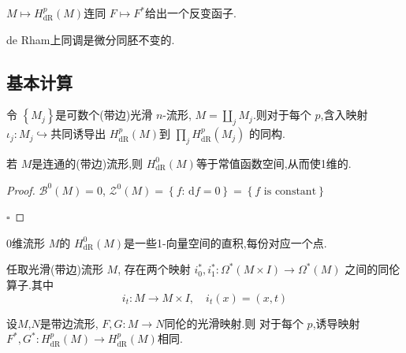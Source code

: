\documentclass[../../几何与拓扑.tex]{subfiles}
\begin{document}
\begin{corollary}
    \(  M\mapsto H_{\mathrm{dR}}^{p}\left( M \right)   \)连同 \(  F\mapsto F^{*}  \)给出一个反变函子.  
\end{corollary}

\begin{corollary}
    de Rham上同调是微分同胚不变的.
\end{corollary}
\subsection{基本计算}

\begin{proposition}
    令 \(  \left\{ M_{j} \right\}  \)是可数个(带边)光滑 \(  n  \)-流形, \(  M= \coprod  _{j}M_{j}  \).则对于每个 \(  p  \),含入映射 \(  \iota _{j}:M_{j}\hookrightarrow   \)共同诱导出 \(  H_{\mathrm{dR}}^{p}\left( M \right)   \)到 \(  \prod _{j}H_{\mathrm{dR}}^{p}\left( M_{j} \right)   \)      的同构.
\end{proposition}


\begin{proposition}
    若 \(  M  \)是连通的(带边)流形,则 \(  H_{\mathrm{dR}}^{0}\left( M \right)   \)等于常值函数空间,从而使1维的.  
\end{proposition}

\begin{proof}
    \(  \mathcal{B}^{0}\left( M \right)= 0   \), \(  \mathcal{Z}^{0}\left( M \right)= \left\{ f: \,\mathrm{d} f= 0 \right\}= \left\{ f \text{ is constant} \right\}   \)  

    \hfill $\square$
\end{proof}

\begin{corollary}
    0维流形 \(  M  \)的 \(  H_{\mathrm{dR}}^{0}\left( M \right)   \)是一些1-向量空间的直积,每份对应一个点.  
\end{corollary}

\begin{lemma}
    任取光滑(带边)流形 \(  M  \), 存在两个映射 \(  i_0^{*},i_1^{*}: \Omega ^{*}\left( M\times I \right)\to  \Omega ^{*}\left( M \right)    \)  之间的同伦算子.其中 \[
   i_{t}:M\to M\times I,\quad  i_{t}\left( x \right)= \left( x,t \right)  
    \]
\end{lemma}


\begin{proposition}
    设\(  M  \),\(  N  \)是带边流形, \(  F,G:M\to N  \)同伦的光滑映射.则  对于每个 \(  p  \),诱导映射 \(  F^{*},G^{*}:H_{\mathrm{dR}}^{p}\left( M \right)\to H_{\mathrm{dR}}^{p}\left( M \right)    \)相同.   
\end{proposition}
\end{document}
